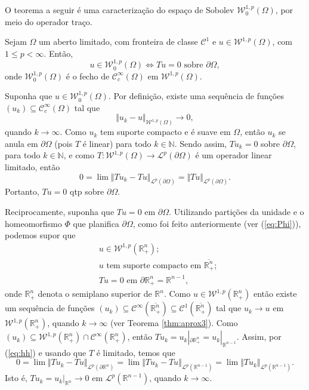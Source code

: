 \documentclass[a4paper, 11pt]{book}
\theoremstyle{definition}
\newcommand{\bN}{\mathbb{N}}
\newcommand{\bR}{\mathbb{R}}
\newcommand{\cC}{\mathcal{C}}
\newcommand{\cL}{\mathcal{L}}
\newcommand{\cW}{\mathcal{W}}
\begin{document}
O teorema a seguir é uma caracterização do espaço de Sobolev $\cW^{1,p}_0(\Omega)$, por meio do operador traço.

\begin{tbox}[Funções traço zero em $\cW^{1,p}$] \label{thm:traco-2}
    Sejam $\Omega$ um aberto limitado, com fronteira de classe $\cC^1$ e $u \in \cW^{1,p}(\Omega)$, com $1 \leqslant p < \infty$. Então,
    \[
        u \in \cW_0^{1,p}(\Omega) \iff Tu = 0 \text{ sobre } \partial \Omega,
    \]
    onde $\cW_0^{1,p}(\Omega)$ é o fecho de $\cC^{\infty}_c(\Omega)$ em $\cW^{1,p}(\Omega)$.
\end{tbox}
\begin{prf}
    Suponha que $u \in \cW_0^{1,p}(\Omega)$. Por definição, existe uma sequência de funções $(u_k) \subseteq \cC^{\infty}_c(\Omega)$ tal que
    \[
        \Vert u_k - u \Vert_{\cW^{1,p}(\Omega)} \to 0,
    \]
    quando $k \to \infty$. Como $u_k$ tem suporte compacto e é suave em $\Omega$, então $u_k$ se anula em $\partial \Omega$ (pois $T$ é linear) para todo $k \in \bN$. Sendo assim, $Tu_k = 0$ sobre $\partial\Omega$, para todo $k \in \bN$, e como $T : \cW^{1,p}(\Omega) \to \cL^p(\partial \Omega)$ é um operador linear limitado, então
    \[
        0 = \lim \Vert Tu_k - Tu \Vert_{\cL^p(\partial \Omega)} = \Vert Tu \Vert_{\cL^p(\partial \Omega)}.
    \]
    Portanto, $Tu =0$ qtp sobre $\partial \Omega$.

    Reciprocamente, suponha que $Tu = 0$ em $\partial \Omega$. Utilizando partições da unidade e o homeomorfismo $\Phi$ que planifica $\partial \Omega$, como foi feito anteriormente (ver (\ref{eq:Phi})), podemos supor que
    \begin{equation} \label{eq:hh}
        \begin{aligned}
            &u \in \cW^{1,p}(\bR^n_+);\\
            &u \text{ tem suporte compacto em } \overline{\bR^n_+};\\
            &Tu = 0 \text{ em } \partial \bR^n_+ = \bR^{n-1},
        \end{aligned}
    \end{equation}
    onde $\bR^n_+$ denota o semiplano superior de $\bR^n$.
    Como $u \in \cW^{1,p}(\bR^n_+)$ então existe um sequência de funções $(u_k) \subseteq \cC^{\infty}(\overline{\bR^n_+}) \subseteq \cC^1(\overline{\bR^n_+})$ tal que $u_k \to u$ em $\cW^{1,p}(\bR^n_+)$, quando $k \to \infty$ (ver Teorema \ref{thm:aprox3}). Como $(u_k) \subseteq \cW^{1,p}(\bR^n_+) \cap \cC^\infty(\bR^n_+)$, então $T u_k = u_k |_{\partial \bR^n_+} = u_k |_{\bR^{n-1}}$.
    Assim, por (\ref{eq:hh}) e usando que $T$ é limitado, temos que
    \begin{equation} \label{eq:nanna}
        0 = \lim \Vert Tu_k - Tu \Vert_{\cL^p(\partial \bR^n)} = \lim \Vert Tu_k - Tu \Vert_{\cL^p(\bR^{n-1})} = \lim \Vert Tu_k \Vert_{\cL^p(\bR^{n-1})}.
    \end{equation}
    Isto é, $T u_k = u_k |_{\bR^n} \to 0$ em $\cL^p(\bR^{n-1})$, quando $k \to \infty$.


\end{prf}
\end{document}
